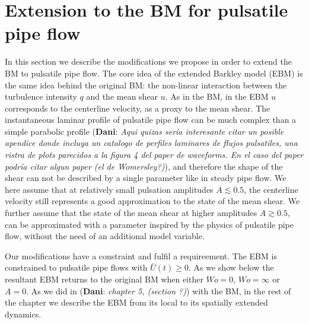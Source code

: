 \documentclass{article}
\DeclareRobustCommand{\dm}[1]{{\color{blue}(\textbf{Dani}: \textit{#1}\xspace)}}
\begin{document}
\section{Extension to the BM for pulsatile pipe flow}
In this section we describe the modifications we propose in order to extend the BM to pulsatile pipe flow. The core idea of the extended Barkley model (EBM) is the same idea behind the original BM: the non-linear interaction between the turbulence intensity $q$ and the mean shear $u$. As in the BM, in the EBM $u$ corresponds to the centerline velocity, as a proxy to the  mean shear. The instantaneous laminar profile of pulsatile pipe flow can be much complex than a simple parabolic profile \dm{Aqui quizas sería interesante citar un posible apendice donde incluya un catalogo de perfiles laminares de flujos pulsatiles, una ristra de plots parecidos a la figura 4 del paper de waveforms. En el caso del paper podría citar algun paper (el de Womersley?)}, and therefore the shape of the shear can not be described by a single parameter like in steady pipe flow. We here assume that at relatively small pulsation amplitudes $A \lesssim 0.5$, the centerline velocity still represents a good approximation to the state of the mean shear. We further assume that the state of the mean shear at higher amplitudes $A \gtrsim 0.5$, can be approximated with a parameter inspired by the physics of pulsatile pipe flow, without the need of an additional model variable. 

Our modifications have a constraint and fulfil a requireement. The EBM is constrained to pulsatile pipe flows with $\bar{U}\left( t \right) \geq 0$. As we show below the resultant EBM returns to the original BM when either $Wo=0$, $Wo=\infty$ or $A=0$. As we did in \dm{chapter 5, (section ?)} with the BM, in the rest of the chapter we describe the EBM from its local to its spatially extended dynamics.





\end{document}
